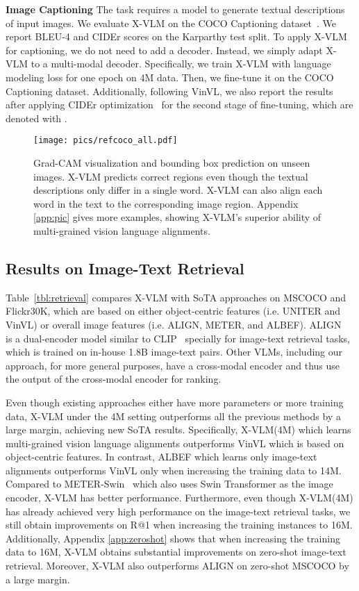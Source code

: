 \documentclass[nohyperref]{article}
\theoremstyle{plain}
\theoremstyle{definition}
\theoremstyle{remark}
\begin{document}
\noindent \textbf{Image Captioning} The task requires a model to generate textual descriptions of input images. We evaluate X-VLM on the COCO Captioning dataset~\cite{chen2015microsoft}. We report BLEU-4 and CIDEr scores on the Karparthy test split. To apply X-VLM for captioning, we do not need to add a decoder. Instead, we simply adapt X-VLM to a multi-modal decoder. Specifically, we train X-VLM with language modeling loss for one epoch on 4M data. Then, we fine-tune it on the COCO Captioning dataset. Additionally, following VinVL, we also report the results after applying CIDEr optimization~\cite{rennie2017self} for the second stage of fine-tuning, which are denoted with . 



\begin{figure*}[ht]
\centering
\centerline{\texttt{[image: pics/refcoco\_all.pdf]}}
\caption{Grad-CAM visualization and bounding box prediction on unseen images. X-VLM predicts correct regions even though the textual descriptions only differ in a single word. X-VLM can also align each word in the text to the corresponding image region. Appendix \ref{app:pic} gives more examples, showing X-VLM's superior ability of multi-grained vision language alignments. }
\label{Fig:refcoco_all}
\end{figure*}


\subsection{Results on Image-Text Retrieval}
Table~\ref{tbl:retrieval} compares X-VLM with SoTA approaches on MSCOCO and Flickr30K, which are based on either object-centric features (i.e. UNITER and VinVL) or overall image features (i.e. ALIGN, METER, and ALBEF). ALIGN~\cite{jia2021scaling} is a dual-encoder model similar to CLIP~\cite{radford2021learning} specially for image-text retrieval tasks, which is trained on in-house 1.8B image-text pairs. Other VLMs, including our approach, for more general purposes, have a cross-modal encoder and thus use the output of the cross-modal encoder for ranking. 


Even though existing approaches either have more parameters or more training data, X-VLM under the 4M setting outperforms all the previous methods by a large margin, achieving new SoTA results. Specifically, X-VLM(4M) which learns multi-grained vision language alignments outperforms VinVL which is based on object-centric features. In contrast, ALBEF which learns only image-text alignments outperforms VinVL only when increasing the training data to 14M. Compared to METER-Swin~\cite{dou2021empirical} which also uses Swin Transformer as the image encoder, X-VLM has better performance. Furthermore, even though X-VLM(4M) has already achieved very high performance on the image-text retrieval tasks, we still obtain improvements on R@1 when increasing the training instances to 16M. Additionally, Appendix \ref{app:zeroshot} shows that when increasing the training data to 16M, X-VLM obtains substantial improvements on zero-shot image-text retrieval. Moreover, X-VLM also outperforms ALIGN on zero-shot MSCOCO by a large margin. 
\end{document}
